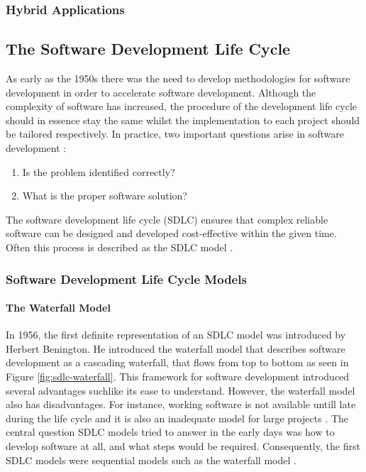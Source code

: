 \subsubsection{Hybrid Applications}


\subsection{The Software Development Life Cycle}
As early as the 1950s there was the need to develop methodologies for software development in order to accelerate software development. Although the complexity of software has increased, the procedure of the development life cycle should in essence stay the same whilst the implementation to each project should be tailored respectively. In practice, two important questions arise in software development \cite{langer2012guide}:
\begin{enumerate}
    \item Is the problem identified correctly?
    \item What is the proper software solution?
\end{enumerate}
The software development life cycle (SDLC) ensures that complex reliable software can be designed and developed cost-effective within the given time. Often this process is described as the SDLC model \cite{S_2017}.

\subsubsection{Software Development Life Cycle Models}

\paragraph{The Waterfall Model} In 1956, the first definite representation of an SDLC model was introduced by Herbert Benington. He introduced the waterfall model that describes software development as a cascading waterfall, that flows from top to bottom as seen in Figure \ref{fig:sdlc-waterfall}. This framework for software development introduced several advantages suchlike its ease to understand. However, the waterfall model also has disadvantages. For instance, working software is not available untill late during the life cycle and it is also an inadequate model for large projects \cite{S_2017}. The central question SDLC models tried to answer in the early days was how to develop software at all, and what steps would be required. Consequently, the first SDLC models were sequential models such as the waterfall model \cite{Kneuper_2017}. 


